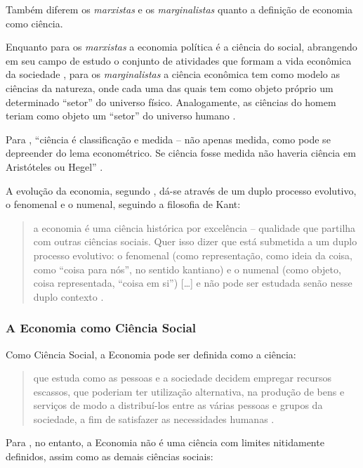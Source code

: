 \documentclass[]{article}
\begin{document}
Também diferem os \emph{marxistas} e os \emph{marginalistas} quanto a
definição de economia como ciência.

Enquanto para os \emph{marxistas} a economia política é a ciência do
social, abrangendo em seu campo de estudo o conjunto de atividades que
formam a vida econômica da sociedade \cite[p.~14]{singer}, para os
\emph{marginalistas} a ciência econômica tem como modelo as ciências da
natureza, onde cada uma das quais tem como objeto próprio um determinado
``setor'' do universo físico. Analogamente, as ciências do homem teriam
como objeto um ``setor'' do universo humano \cite[p.~15]{singer}.

Para , ``ciência é classificação e medida
-- não apenas medida, como pode se depreender do lema econométrico. Se
ciência fosse medida não haveria ciência em Aristóteles ou Hegel''
\cite[p.~204]{rangel1956}.

A evolução da economia, segundo , dá-se através
de um duplo processo evolutivo, o fenomenal e o numenal, seguindo a
filosofia de Kant:

\begin{quote}
a economia é uma ciência histórica por excelência -- qualidade que
partilha com outras ciências sociais. Quer isso dizer que está submetida
a um duplo processo evolutivo: o fenomenal (como representação, como
ideia da coisa, como ``coisa para nós'', no sentido kantiano) e o
numenal (como objeto, coisa representada, ``coisa em si'')
{[}\ldots{}{]} e não pode ser estudada senão nesse duplo contexto
\cite[p.~204]{rangel1956}.
\end{quote}

\subsubsection{A Economia como Ciência
Social}\label{a-economia-como-ciencia-social}

Como Ciência Social, a Economia pode ser definida como a ciência:

\begin{quote}
que estuda como as pessoas e a sociedade decidem empregar recursos
escassos, que poderiam ter utilização alternativa, na produção de bens e
serviços de modo a distribuí-los entre as várias pessoas e grupos da
sociedade, a fim de satisfazer as necessidades humanas
\cite[p.~5]{passosnogami}.
\end{quote}

Para , no entanto, a Economia não é uma
ciência com limites nitidamente definidos, assim como as demais ciências
sociais:
\end{document}
